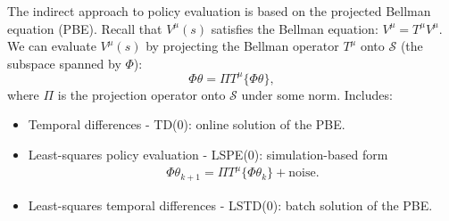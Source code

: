 The indirect approach to policy evaluation is based on the projected Bellman equation (PBE). Recall that $V^\mu(s)$ satisfies the Bellman equation: $V^\mu = T^\mu V^\mu$. We can evaluate $V^\mu(s)$ by projecting the Bellman operator $T^\mu$ onto $\mathcal{S}$ (the subspace spanned by $\Phi$):
\begin{equation*}
    \Phi \theta = \Pi T^\mu \{\Phi \theta\},
\end{equation*}
where $\Pi$ is the projection operator onto $\mathcal{S}$ under some norm.
Includes:
\begin{itemize}
\item Temporal differences - TD(0): online solution of the PBE.
\item Least-squares policy evaluation - LSPE(0): simulation-based form
\begin{align*}\Phi \theta_{k+1} = \Pi T^\mu \{\Phi \theta_k\} + \mathrm{noise}.\end{align*} 
\item Least-squares temporal differences - LSTD(0): batch solution of the PBE.
\end{itemize}

